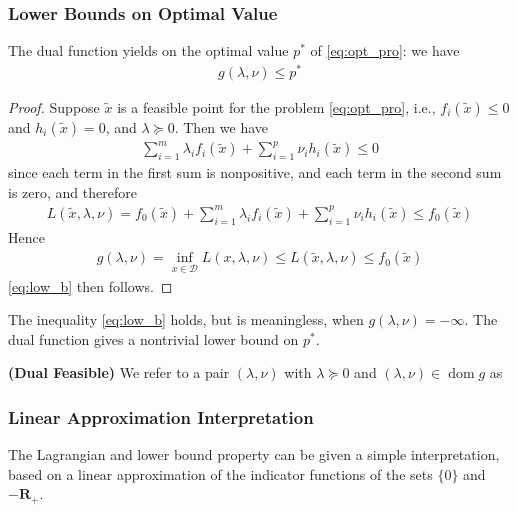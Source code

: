\documentclass{article}
\newcommand{\bfs}[1]{\textbf{({#1}) }}
\begin{document}
\subsubsection{Lower Bounds on Optimal Value}
\begin{lema}\label{lem:lowb}
 The dual function yields  on the optimal value $p^* $ of \cref{eq:opt_pro}:  we have
\begin{align}
g(\lambda, \nu) \leq p^* \label{eq:low_b}
\end{align}
\end{lema}
\begin{proof}\color{ForestGreen}
Suppose $\tilde{x}$ is a feasible point for the problem \cref{eq:opt_pro}, i.e., $f_{i}(\tilde{x}) \leq 0$ and $h_{i}(\tilde{x})=0$, and $\lambda \succeq 0 .$ Then we have
\begin{align*}
\sum_{i=1}^{m} \lambda_{i} f_{i}(\tilde{x})+\sum_{i=1}^{p} \nu_{i} h_{i}(\tilde{x}) \leq 0
\end{align*}
since each term in the first sum is nonpositive, and each term in the second sum is zero, and therefore
\begin{align*}
L(\tilde{x}, \lambda, \nu)=f_{0}(\tilde{x})+\sum_{i=1}^{m} \lambda_{i} f_{i}(\tilde{x})+\sum_{i=1}^{p} \nu_{i} h_{i}(\tilde{x}) \leq f_{0}(\tilde{x})
\end{align*}
Hence
\begin{align*}
g(\lambda, \nu)=\inf _{x \in \mathcal{D}} L(x, \lambda, \nu) \leq L(\tilde{x}, \lambda, \nu) \leq f_{0}(\tilde{x})
\end{align*}
\cref{eq:low_b} then follows.
\end{proof} 
\begin{rema}
The inequality \cref{eq:low_b} holds, but is meaningless, when $g(\lambda, \nu)=-\infty$. The dual function gives a nontrivial lower bound on $p^* $. 
\end{rema}
\begin{defa}\bfs{Dual Feasible}\label{def:dual_fea}
We refer to a pair $(\lambda, \nu)$ with $\lambda \succeq 0$ and $(\lambda, \nu) \in \operatorname{dom} g$ as 
\end{defa}
\subsubsection{Linear Approximation Interpretation}
The Lagrangian and lower bound property can be given a simple interpretation, based on a linear approximation of the indicator functions of the sets $\{0\}$ and $-\mathbf{R}_{+}$.
\end{document}
